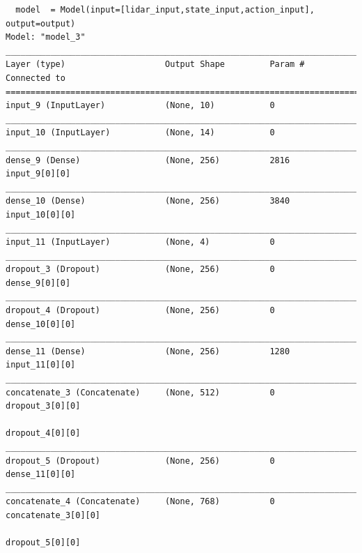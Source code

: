 \documentclass[man, 12pt]{apa6}
\begin{document}
\begin{verbatim}
  model  = Model(input=[lidar_input,state_input,action_input], output=output)
Model: "model_3"
__________________________________________________________________________________________________
Layer (type)                    Output Shape         Param #     Connected to                     
==================================================================================================
input_9 (InputLayer)            (None, 10)           0                                            
__________________________________________________________________________________________________
input_10 (InputLayer)           (None, 14)           0                                            
__________________________________________________________________________________________________
dense_9 (Dense)                 (None, 256)          2816        input_9[0][0]                    
__________________________________________________________________________________________________
dense_10 (Dense)                (None, 256)          3840        input_10[0][0]                   
__________________________________________________________________________________________________
input_11 (InputLayer)           (None, 4)            0                                            
__________________________________________________________________________________________________
dropout_3 (Dropout)             (None, 256)          0           dense_9[0][0]                    
__________________________________________________________________________________________________
dropout_4 (Dropout)             (None, 256)          0           dense_10[0][0]                   
__________________________________________________________________________________________________
dense_11 (Dense)                (None, 256)          1280        input_11[0][0]                   
__________________________________________________________________________________________________
concatenate_3 (Concatenate)     (None, 512)          0           dropout_3[0][0]                  
                                                                 dropout_4[0][0]                  
__________________________________________________________________________________________________
dropout_5 (Dropout)             (None, 256)          0           dense_11[0][0]                   
__________________________________________________________________________________________________
concatenate_4 (Concatenate)     (None, 768)          0           concatenate_3[0][0]              
                                                                 dropout_5[0][0]                  

\end{verbatim}
\end{document}
